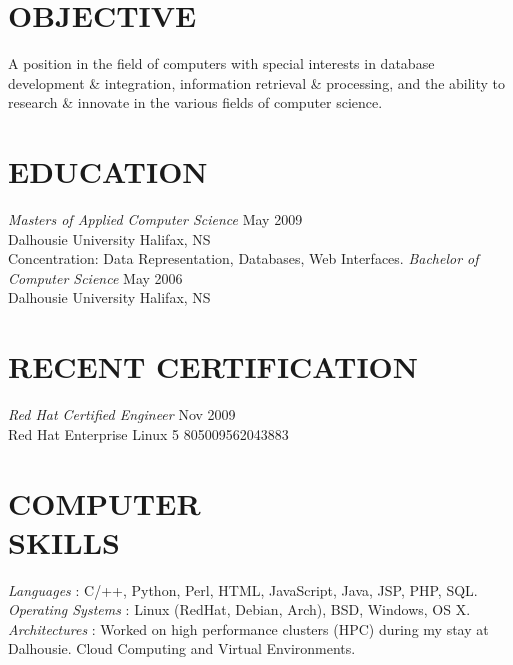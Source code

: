 \documentclass[line,margin]{res}
\begin{document}
\address{3139 Veith Street, Halifax, NS B3K 3G9}
\address{(902) 489-2557 or (902) 444-4974}


\begin{resume}

\section{OBJECTIVE}
    A position in the field of computers with special
    interests in database development {\&} integration,
    information retrieval {\&} processing, and the ability to
    research {\&} innovate in the various fields of computer
    science.


\section{EDUCATION}
    {\sl Masters of Applied Computer Science} \hfill May 2009\\
        Dalhousie University \hfill Halifax, NS\\
        Concentration: Data Representation, Databases,
        Web Interfaces.  \medskip
    \newline
    {\sl Bachelor of Computer Science} \hfill May 2006\\
        Dalhousie University \hfill Halifax, NS

\section{RECENT CERTIFICATION}
    {\sl Red Hat Certified Engineer} \hfill Nov 2009\\
        Red Hat Enterprise Linux 5 \hfill 805009562043883\\

\section{COMPUTER \\ SKILLS}
    {\sl Languages \hspace{35pt}}:
     C/++, Python, Perl, HTML, JavaScript, Java, JSP, PHP, SQL.\\
    {\sl Operating Systems }:
     Linux (RedHat, Debian, Arch), BSD, Windows, OS X. \\
    {\sl Architectures \hspace{27pt}}:
     Worked on high performance clusters (HPC) during my stay at \\
     \hspace*{92pt} Dalhousie. Cloud Computing and Virtual Environments.


\end{resume}
\end{document}
